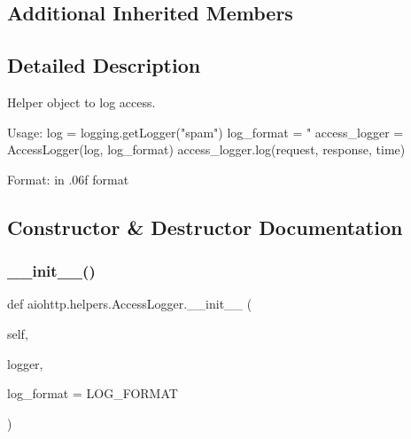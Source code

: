 \subsection*{Additional Inherited Members}


\subsection{Detailed Description}
\begin{DoxyVerb}Helper object to log access.

Usage:
    log = logging.getLogger("spam")
    log_format = "%
    access_logger = AccessLogger(log, log_format)
    access_logger.log(request, response, time)

Format:
        in .06f format
 

\subsection{Constructor \& Destructor Documentation}
\mbox{\label{classaiohttp_1_1helpers_1_1_access_logger_ad0d3b542f6036f62cd3c10593dd225a1}} 
\subsubsection{\texorpdfstring{\+\_\+\+\_\+init\+\_\+\+\_\+()}{\_\_init\_\_()}}
{\footnotesize\ttfamily def aiohttp.\+helpers.\+Access\+Logger.\+\_\+\+\_\+init\+\_\+\+\_\+ (\begin{DoxyParamCaption}\item[{}]{self,  }\item[{}]{logger,  }\item[{}]{log\+\_\+format = {\ttfamily LOG\+\_\+FORMAT} }\end{DoxyParamCaption})}


\end{DoxyVerb}

